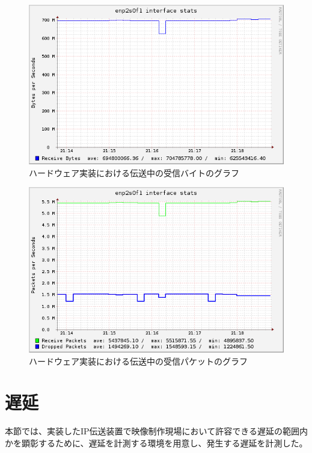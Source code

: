 \begin{figure}[htbp]
  \begin{center}
    \includegraphics[bb=0 0 597 374,width=11.8cm]{img/enp2s0f1-bytes-graph.png}
  \end{center}
  \caption{ハードウェア実装における伝送中の受信バイトのグラフ}
  \label{fig:enp2s0f1-bytes-graph}
\end{figure}

\begin{figure}[htbp]
  \begin{center}
    \includegraphics[bb=0 0 597 388,width=11.8cm]{img/enp2s0f1-packets-graph.png}
  \end{center}
  \caption{ハードウェア実装における伝送中の受信パケットのグラフ}
  \label{fig:enp2s0f1-packets-graph}
\end{figure}


\newpage
\section{遅延}

本節では、実装したIP伝送装置で映像制作現場において許容できる遅延の範囲内かを顕彰するために、遅延を計測する環境を用意し、発生する遅延を計測した。


